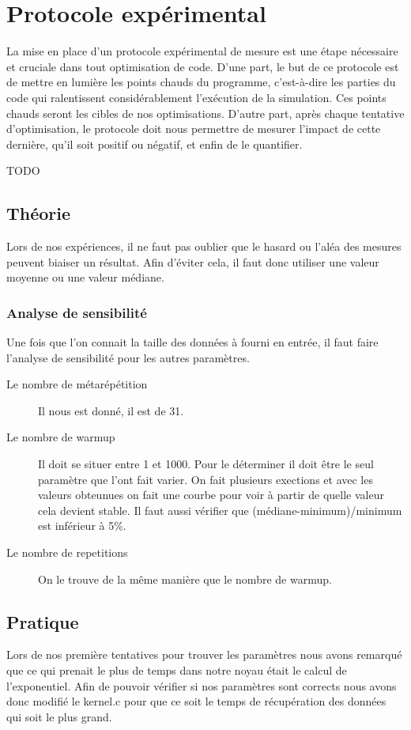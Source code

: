 \documentclass[12pt,a4paper]{article}
\begin{document}
\section{Protocole expérimental}

La mise en place d'un protocole expérimental de mesure est une étape nécessaire
et cruciale dans tout optimisation de code. D'une part, le but de ce protocole
est de mettre en lumière les points chauds du programme, c'est-à-dire les
parties du code qui ralentissent considérablement l'exécution de la simulation.
Ces points chauds seront les cibles de nos optimisations. D'autre part, après
chaque tentative d'optimisation, le protocole doit nous permettre de mesurer
l'impact de cette dernière, qu'il soit positif ou négatif, et enfin de le
quantifier.


TODO



\subsection{Théorie}

Lors de nos expériences, il ne faut pas oublier que le hasard ou l'aléa des
mesures peuvent biaiser un résultat. Afin d'éviter cela, il faut donc utiliser
une valeur moyenne ou une valeur médiane.

\subsubsection{Analyse de sensibilité}

Une fois que l'on connait la taille des données à fourni en entrée, 
il faut faire l'analyse de sensibilité pour les autres paramètres. 
\begin{description}
    \item[Le nombre de métarépétition] Il nous est donné, il est de 31.
    \item[Le nombre de warmup] Il doit se situer entre 1 et 1000. Pour le 
    déterminer il doit être le seul paramètre que l'ont fait varier. On fait 
    plusieurs exections et avec les valeurs obteunues on fait une courbe pour 
    voir à partir de quelle valeur cela devient stable. Il faut aussi vérifier 
    que (médiane-minimum)/minimum est inférieur à 5\%. 
    \item[Le nombre de repetitions] On le trouve de la même manière que 
    le nombre de warmup.
\end{description}


\subsection{Pratique}
Lors de nos première tentatives pour trouver les paramètres nous avons remarqué
que ce qui prenait le plus de temps dans notre noyau était le calcul de 
l'exponentiel. Afin de pouvoir vérifier si nos paramètres sont corrects nous
avons donc modifié le kernel.c pour que ce soit le temps de récupération des
données qui soit le plus grand.
\end{document}
